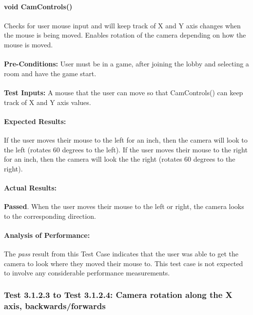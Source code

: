 \documentclass{article}
\begin{document}
    \paragraph{}\textbf{void CamControls()}
    \paragraph{} Checks for user mouse input and will keep track of X and Y axis changes when the mouse is being moved. Enables rotation of the camera depending on how the mouse is moved.
    \paragraph{}\textbf{Pre-Conditions:} User must be in a game, after joining the lobby and selecting a room and have the game start.
    \paragraph{}\textbf{Test Inputs:} A mouse that the user can move so that CamControls() can keep track of X and Y axis values.
    \paragraph{Expected Results:} If the user moves their mouse to the left for an inch, then the camera will look to the left (rotates 60 degrees to the left). If the user moves their mouse to the right for an inch, then the camera will look the the right (rotates 60 degrees to the right).
    \paragraph{Actual Results:} \textbf{Passed}. When the user moves their mouse to the left or right, the camera looks to the corresponding direction. 
    \paragraph{Analysis of Performance:} The \emph{pass} result from this Test Case indicates that the user was able to get the camera to look where they moved their mouse to. This test case is not expected to involve any considerable performance measurements. 
    
    \subsubsection{Test 3.1.2.3 to Test 3.1.2.4: Camera rotation along the X axis, backwards/forwards}
\end{document}
